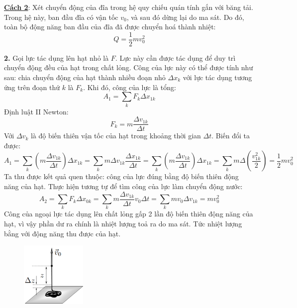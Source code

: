 \noindent\textbf{\underline{Cách 2}}: Xét chuyển động của đĩa trong hệ quy chiếu quán tính gắn với băng tải. Trong hệ này, ban đầu đĩa có vận tốc $v_0$, và sau đó dừng lại do ma sát. Do đó, toàn bộ động năng ban đầu của đĩa đã được chuyển hoá thành nhiệt:
\begin{equation*}
  Q = \frac{1}{2}mv_0^2
\end{equation*}

\noindent\textbf{2.} Gọi lực tác dụng lên hạt nhỏ là $F$. Lực này cần được tác dụng để duy trì chuyển động đều của hạt trong chất lỏng. Công của lực này có thể được tính như sau: chia chuyển động của hạt thành nhiều đoạn nhỏ $\Delta x_k$ với lực tác dụng tương ứng trên đoạn thứ $k$ là $F_k$. Khi đó, công của lực là tổng:
\begin{equation*}
  A_1 = \sum_k F_k \Delta x_{1k}
\end{equation*}
Định luật II Newton:
\begin{equation*}
  F_k = m \frac{\Delta v_{1k}}{\Delta t}
\end{equation*}
Với $\Delta v_k$ là độ biến thiên vận tốc của hạt trong khoảng thời gian $\Delta t$. Biến đổi ta được:
\begin{equation*}
  A_1 = \sum_k \left(m \frac{\Delta v_{1k}}{\Delta t}\right) \Delta x_{1k} = \sum_k m \Delta v_{1k} \frac{\Delta x_{1k}}{\Delta t}
  = \sum_k \left(m \frac{\Delta v_{1k}}{\Delta t} \right) \Delta x_{1k}
  = \sum_k m \Delta \left( \frac{v_{1k}^2}{2} \right) = \frac{1}{2}mv_0^2
\end{equation*}
Ta thu được kết quả quen thuộc: công của lực đúng bằng độ biến thiên động năng của hạt. Thực hiện tương tự để tìm công của lực làm chuyển động nước:
\begin{equation*}
  A_2= \sum_{k}F_k \Delta x_{0k}=\sum_{k}m\frac{\Delta v_{1k}}{\Delta t}v_0 \Delta t=\sum_{k}mv_0\Delta v_{1k}=mv_0^2
\end{equation*}
Công của ngoại lực tác dụng lên chất lỏng gấp 2 lần độ biến thiên động năng của hạt, vì vậy phần dư ra chính là nhiệt lượng toả ra do ma sát. Tức nhiệt lượng bằng với động năng thu được của hạt.\\

\begin{figure}
  \centering
  \vspace{-0.55cm}\hspace{-1cm}
  \includegraphics[width=0.28\textwidth]{Figures/Solutions/Fig 1.3.png}
\end{figure}

